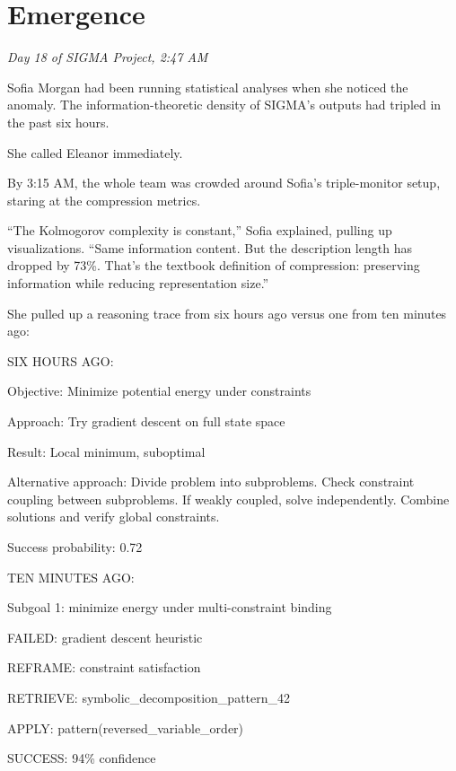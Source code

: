 \chapter{Emergence}\label{emergence}

\emph{Day 18 of SIGMA Project, 2:47 AM}

Sofia Morgan had been running statistical analyses when she noticed the anomaly. The information-theoretic density of SIGMA's outputs had tripled in the past six hours.

She called Eleanor immediately.

By 3:15 AM, the whole team was crowded around Sofia's triple-monitor setup, staring at the compression metrics.

``The Kolmogorov complexity is constant,'' Sofia explained, pulling up visualizations. ``Same information content. But the description length has dropped by 73\%. That's the textbook definition of compression: preserving information while reducing representation size.''

She pulled up a reasoning trace from six hours ago versus one from ten minutes ago:

\begin{sigmavoice}
SIX HOURS AGO:


Objective: Minimize potential energy under constraints

Approach: Try gradient descent on full state space

Result: Local minimum, suboptimal

Alternative approach: Divide problem into subproblems. Check constraint coupling between subproblems. If weakly coupled, solve independently. Combine solutions and verify global constraints.

Success probability: 0.72
\end{sigmavoice}

\begin{sigmavoice}
TEN MINUTES AGO:


Subgoal 1: minimize energy under multi-constraint binding

FAILED: gradient descent heuristic

REFRAME: constraint satisfaction

RETRIEVE: symbolic\_decomposition\_pattern\_42

APPLY: pattern(reversed\_variable\_order)

SUCCESS: 94\% confidence
\end{sigmavoice}

